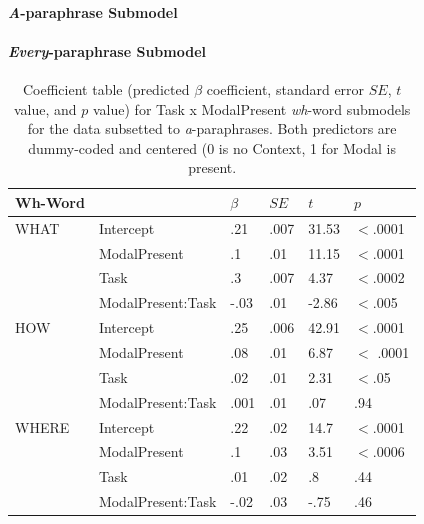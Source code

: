 \documentclass[12pt,letterpaper,table,svgnames,dvipsnames]{article}
\begin{document}
\paragraph{\emph{A}-paraphrase Submodel}

\paragraph{\emph{Every}-paraphrase Submodel}


\begin{table}
\begin{center} 
\caption{Coefficient table (predicted $\beta$ coefficient, standard error $SE$, $t$ value, and $p$ value) for Task x ModalPresent \emph{wh}-word submodels for the data subsetted to \emph{a}-paraphrases. Both predictors are dummy-coded and centered (0 is no Context, 1 for Modal is present.} 
\label{sub-models_res_Task-a} 
\begin{tabular}{l|lllll} 
\toprule
Wh-Word & {} & $\beta$ & $SE$ & $t$ & $p$\\
\midrule
WHAT & Intercept & .21 & .007 & 31.53 & $<$.0001\\
{} & ModalPresent & .1 & .01 & 11.15 & $<$.0001\\
{} & Task & .3 & .007 & 4.37 & $<$.0002\\
{} & ModalPresent:Task & -.03 & .01 & -2.86 & $<$.005\\
\bottomrule
\toprule
HOW & Intercept & .25 & .006 & 42.91 & $<$.0001\\
{} & ModalPresent & .08 & .01 & 6.87 & $<$ .0001\\
{} & Task & .02 & .01 & 2.31 & $<$.05\\
{} & ModalPresent:Task & .001 & .01 & .07 & .94\\
\toprule
WHERE & Intercept & .22 & .02 & 14.7 & $<$.0001\\
{} & ModalPresent & .1 & .03 & 3.51 & $<$.0006\\
{} & Task & .01 & .02 & .8 & .44\\
{} & ModalPresent:Task & -.02 & .03 & -.75 & .46\\
\bottomrule
\toprule

\end{tabular}
\end{center}
\end{table}
\end{document}
